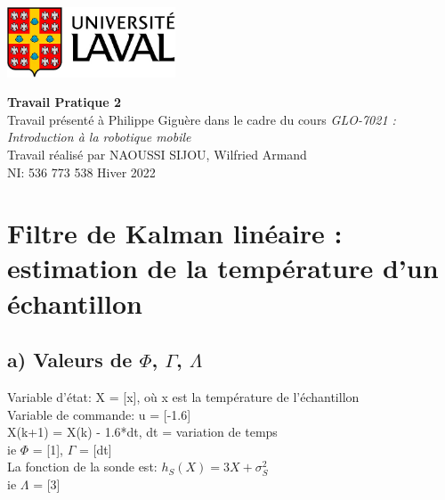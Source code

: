 \documentclass[11pt]{article}		%
\begin{document}
\thispagestyle{empty}	%
\includegraphics[width=5cm]{logo.jpg}	%
\vspace{4cm}	%
\begin{center}	%
{\huge \bf Travail Pratique 2}\\	%
\vspace{3cm}
\large Travail présenté à Philippe Giguère dans le cadre du cours \emph{GLO-7021 : Introduction à la robotique mobile}\\
\vspace{3cm}
Travail réalisé par NAOUSSI SIJOU, Wilfried Armand \\
NI: 536 773 538
\vfill	%
Hiver 2022
\end{center}

\newpage
\section {Filtre de Kalman linéaire : estimation de la température d'un échantillon}

\subsection{a) Valeurs de $\Phi$, $\Gamma$, $\Lambda$}

\noindent Variable d'état:  X = [x], où x est la température de l'échantillon \\
\noindent Variable de commande: u = [-1.6] \\

\noindent X(k+1) = X(k) - 1.6*dt, dt = variation de temps \\
\noindent ie $\Phi$ = [1], $\Gamma$ = [dt] \\

\noindent La fonction de la sonde est: $h_S(X) = 3X + \sigma _S^2$ \\
\noindent ie $\Lambda$ = [3]\\
\end{document}
